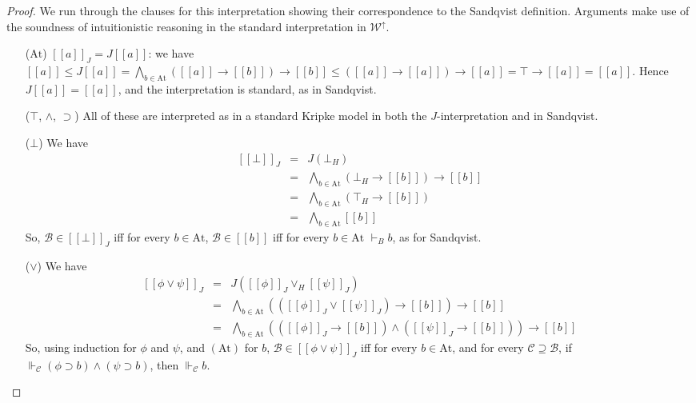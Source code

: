 \documentclass[10pt,a4paper]{amsart}
\newcommand{\At}{\text{At}}
\newcommand{\base}[1]{\mathscr{#1}}
\newcommand{\db}[1]{[\![#1]\!]}
\newcommand{\derives}[1]{\vdash_{\!#1}}
\newcommand{\support}[2]{\Vdash_{\base{#1}}#2}
\newcommand{\worlds}{\mathcal W}
\begin{document}
\begin{proof}
    We run through the clauses for this interpretation showing their correspondence to the Sandqvist definition. Arguments make use of the soundness of intuitionistic reasoning in the standard interpretation in $\worlds^\uparrow$.

\smallskip 
    
\begin{itemize}[align=left]
    \item[($\At$)] $\db{a}_J = J \db{a}$: we have $\db{a} \leq J \db{a} = \bigwedge_{b\in\At} (\db{a}\to \db{b})\to \db{b} \leq (\db{a}\to \db{a}) \to \db{a} = \top\to \db{a} = \db{a}$. Hence $J \db{a} = \db{a}$, and the interpretation is standard, as in Sandqvist. \vspace{1mm} 
    \item[($\top$, $\wedge$, $\supset$)] All of these are interpreted as in a standard Kripke model in both the $J$-interpretation and in Sandqvist. \vspace{1mm}
    \item[($\bot$)] We have 
    \[
    \begin{array}{rcl} 
    \db{\bot}_J & = & J (\bot_H) \\ 
                & = & \bigwedge_{b\in\At} (\bot_H\to \db{b})\to \db{b} \\
                & = & \bigwedge_{b\in\At} (\top_H \to \db{b}) \\ 
                & = & \bigwedge_{b\in\At} \db{b}
    \end{array}
    \]
    So, $\base{B}\in\db{\bot}_J$ iff for every $b\in\At$, $\base{B}\in\db{b}$ iff for every $b\in\At$ $\derives{B}{b}$, as for Sandqvist. \vspace{1mm}
    \item[($\vee$)] We have 
    \[
    \begin{array}{rcl} 
    \db{\phi\vee\psi}_J & = & J(\db{\phi}_J\vee_H\db{\psi}_J) \\ 
    & = &\bigwedge_{b\in\At} ((\db{\phi}_J \vee \db{\psi}_J)\to \db{b})\to \db{b} \\ 
    & = & \bigwedge_{b\in\At} ((\db{\phi}_J\to \db{b})\wedge(\db{\psi}_J\to \db{b}))\to \db{b} 
    \end{array}
    \]
    So, using induction for $\phi$ and $\psi$, and $(\At)$ for $b$, $\base{B}\in\db{\phi\vee\psi}_J$ iff for every $b\in\At$, and for every $\base{C}\supseteq\base{B}$, if 
    $\support{C}{({\phi}\supset  {b})\wedge({\psi} \supset  {b})}$, then $\support{C}{{b}}$. 


\end{itemize}
\end{proof}
\end{document}
